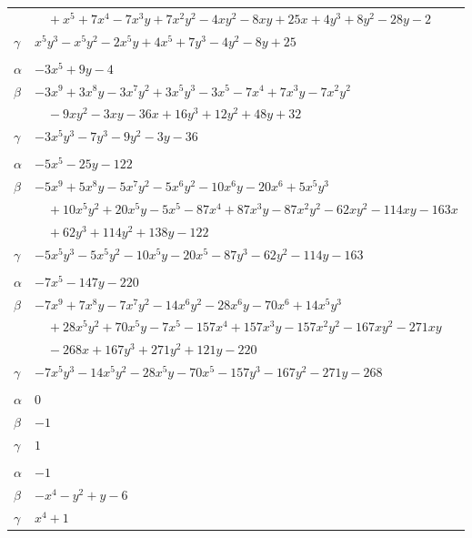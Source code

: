 \documentclass[11pt]{article}
\begin{document}
\begin{longtable}{@{}ll@{}}
 & $\quad +x^{5}+7x^{4}-7x^{3}y+7x^{2}y^{2}-4xy^{2}-8xy+25x+4y^{3}+8y^{2}-28y-2$\\
$\gamma$ & $x^{5}y^{3}-x^{5}y^{2}-2x^{5}y+4x^{5}+7y^{3}-4y^{2}-8y+25$\\
\addlinespace[3pt]
\multicolumn{2}{@{}l}{$\{i,j\}=\{2,35\}$, $k_{ij}=2^{5}$}\\
$\alpha$ & $-3x^{5}+9y-4$\\
$\beta$ & $-3x^{9}+3x^{8}y-3x^{7}y^{2}+3x^{5}y^{3}-3x^{5}-7x^{4}+7x^{3}y-7x^{2}y^{2}$\\
 & $\quad -9xy^{2}-3xy-36x+16y^{3}+12y^{2}+48y+32$\\
$\gamma$ & $-3x^{5}y^{3}-7y^{3}-9y^{2}-3y-36$\\
\addlinespace[3pt]
\multicolumn{2}{@{}l}{$\{i,j\}=\{2,37\}$, $k_{ij}=2^{2}\cdot 3\cdot 17$}\\
$\alpha$ & $-5x^{5}-25y-122$\\
$\beta$ & $-5x^{9}+5x^{8}y-5x^{7}y^{2}-5x^{6}y^{2}-10x^{6}y-20x^{6}+5x^{5}y^{3}$\\
 & $\quad +10x^{5}y^{2}+20x^{5}y-5x^{5}-87x^{4}+87x^{3}y-87x^{2}y^{2}-62xy^{2}-114xy-163x$\\
 & $\quad +62y^{3}+114y^{2}+138y-122$\\
$\gamma$ & $-5x^{5}y^{3}-5x^{5}y^{2}-10x^{5}y-20x^{5}-87y^{3}-62y^{2}-114y-163$\\
\addlinespace[3pt]
\multicolumn{2}{@{}l}{$\{i,j\}=\{2,41\}$, $k_{ij}=2^{4}\cdot 3$}\\
$\alpha$ & $-7x^{5}-147y-220$\\
$\beta$ & $-7x^{9}+7x^{8}y-7x^{7}y^{2}-14x^{6}y^{2}-28x^{6}y-70x^{6}+14x^{5}y^{3}$\\
 & $\quad +28x^{5}y^{2}+70x^{5}y-7x^{5}-157x^{4}+157x^{3}y-157x^{2}y^{2}-167xy^{2}-271xy$\\
 & $\quad -268x+167y^{3}+271y^{2}+121y-220$\\
$\gamma$ & $-7x^{5}y^{3}-14x^{5}y^{2}-28x^{5}y-70x^{5}-157y^{3}-167y^{2}-271y-268$\\
\addlinespace[3pt]
\multicolumn{2}{@{}l}{$\{i,j\}=\{3,4\}$, $k_{ij}=2$}\\
$\alpha$ & $0$\\
$\beta$ & $-1$\\
$\gamma$ & $1$\\
\addlinespace[3pt]
\multicolumn{2}{@{}l}{$\{i,j\}=\{3,10\}$, $k_{ij}=2^{2}$}\\
$\alpha$ & $-1$\\
$\beta$ & $-x^{4}-y^{2}+y-6$\\
$\gamma$ & $x^{4}+1$\\

\end{longtable}
\end{document}
